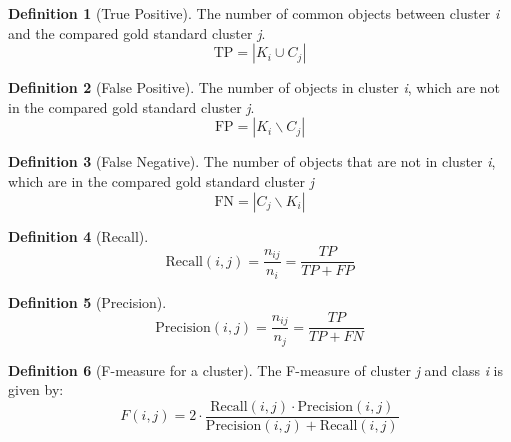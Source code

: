 \documentclass[a4paper,10pt]{article}
\theoremstyle{plain}
\theoremstyle{definition}
\newtheorem{defn}{Definition}
\begin{document}
\begin{defn}[True Positive]\label{}
	The number of common objects between cluster \textit{i} and the compared gold standard cluster \textit{j}.
	\begin{equation}
		\text{TP} = |K_i \cup C_j|
	\end{equation}
\end{defn}

\begin{defn}[False Positive]\label{}
	The number of objects in cluster \textit{i}, which are not in the compared gold standard cluster \textit{j}.
	\begin{equation}
		\text{FP} = |K_i \backslash C_j|
	\end{equation}
\end{defn}

\begin{defn}[False Negative]\label{}
	The number of objects that are not in cluster \textit{i}, which are in the compared gold standard cluster \textit{j}
	\begin{equation}
		\text{FN} = |C_j \backslash K_i|
	\end{equation}
\end{defn}

\begin{defn}[Recall]\label{}
	\begin{equation}
		\text{Recall}(i,j) = \frac{n_{ij}}{n_i} = \frac{TP}{TP + FP}
	\end{equation}
\end{defn}

\begin{defn}[Precision]\label{}
	\begin{equation}
		\text{Precision}(i,j) = \frac{n_{ij}}{n_j} = \frac{TP}{TP + FN}
	\end{equation}
\end{defn}

\begin{defn}[F-measure for a cluster]\label{}
	The F-measure of cluster \textit{j} and class \textit{i} is given by:
	\begin{equation}
		F(i,j) = 2 \cdot \frac{\text{Recall}(i,j) \cdot \text{Precision}(i,j)}{\text{Precision}(i,j) + \text{Recall}(i,j)}
	\end{equation}
\end{defn}
\end{document}

